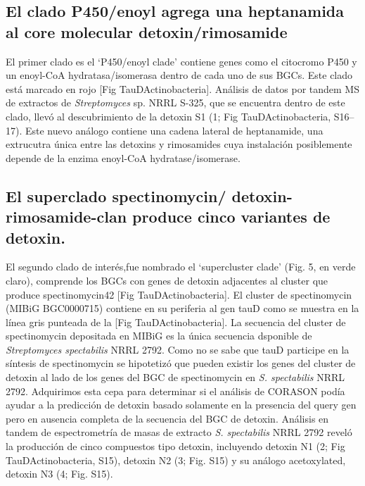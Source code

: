 \documentclass[12pt,twoside]{reedthesis}
\begin{document}
  \subsection{El clado P450/enoyl agrega una heptanamida al core molecular
  detoxin/rimosamide}\label{el-clado-p450enoyl-agrega-una-heptanamida-al-core-molecular-detoxinrimosamide}
  
  El primer clado es el `P450/enoyl clade' contiene genes como el
  citocromo P450 y un enoyl-CoA hydratasa/isomerasa dentro de cada uno de
  sus BGCs. Este clado está marcado en rojo {[}Fig TauDActinobacteria{]}.
  Análisis de datos por tandem MS de extractos de \emph{Streptomyces} sp.
  NRRL S-325, que se encuentra dentro de este clado, llevó al
  descubrimiento de la detoxin S1 (1; Fig TauDActinobacteria, S16--17).
  Este nuevo análogo contiene una cadena lateral de heptanamide, una
  extrucutra única entre las detoxins y rimosamides cuya instalación
  posiblemente depende de la enzima enoyl-CoA hydratase/isomerase.
  
  \subsection{El superclado spectinomycin/ detoxin-rimosamide-clan produce
  cinco variantes de
  detoxin.}\label{el-superclado-spectinomycin-detoxin-rimosamide-clan-produce-cinco-variantes-de-detoxin.}
  
  El segundo clado de interés,fue nombrado el `supercluster clade' (Fig.
  5, en verde claro), comprende los BGCs con genes de detoxin adjacentes
  al cluster que produce spectinomycin42 {[}Fig TauDActinobacteria{]}. El
  cluster de spectinomycin (MIBiG BGC0000715) contiene en su periferia al
  gen tauD como se muestra en la línea gris punteada de la {[}Fig
  TauDActinobacteria{]}. La secuencia del cluster de spectinomycin
  depositada en MIBiG es la única secuencia dsponible de
  \emph{Streptomyces spectabilis} NRRL 2792. Como no se sabe que tauD
  participe en la síntesis de spectinomycin se hipotetizó que pueden
  existir los genes del cluster de detoxin al lado de los genes del BGC de
  spectinomycin en \emph{S. spectabilis} NRRL 2792. Adquirimos esta cepa
  para determinar si el análisis de CORASON podía ayudar a la predicción
  de detoxin basado solamente en la presencia del query gen pero en
  ausencia completa de la secuencia del BGC de detoxin. Análisis en tandem
  de espectrometría de masas de extracto \emph{S. spectabilis} NRRL 2792
  reveló la producción de cinco compuestos tipo detoxin, incluyendo
  detoxin N1 (2; Fig TauDActinobacteria, S15), detoxin N2 (3; Fig. S15) y
  su análogo acetoxylated, detoxin N3 (4; Fig. S15).
  
\end{document}
